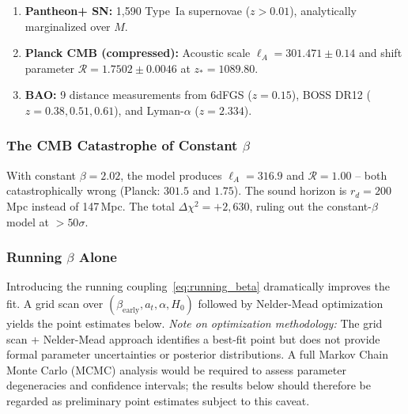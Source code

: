 \documentclass[aps,prd,twocolumn,superscriptaddress,nofootinbib]{revtex4-2}
\begin{document}
\begin{enumerate}
\item \textbf{Pantheon+ SN:} 1,590 Type~Ia supernovae ($z > 0.01$), analytically marginalized over $M$.
\item \textbf{Planck CMB (compressed):} Acoustic scale $\ell_A = 301.471 \pm 0.14$ and shift parameter $\mathcal{R} = 1.7502 \pm 0.0046$ at $z_* = 1089.80$.
\item \textbf{BAO:} 9 distance measurements from 6dFGS ($z = 0.15$), BOSS DR12 \cite{Alam2017} ($z = 0.38, 0.51, 0.61$), and Lyman-$\alpha$ ($z = 2.334$).
\end{enumerate}

\subsubsection{The CMB Catastrophe of Constant $\beta$}

With constant $\beta = 2.02$, the model produces $\ell_A = 316.9$ and $\mathcal{R} = 1.00$ -- both catastrophically wrong (Planck: $301.5$ and $1.75$). The sound horizon is $r_d = 200$\,Mpc instead of 147\,Mpc. The total $\Delta\chi^2 = +2{,}630$, ruling out the constant-$\beta$ model at $>50\sigma$.

\subsubsection{Running $\beta$ Alone}

Introducing the running coupling~\eqref{eq:running_beta} dramatically improves the fit. A grid scan over $(\beta_{\mathrm{early}}, a_t, \alpha, H_0)$ followed by Nelder-Mead optimization yields the point estimates below. \textit{Note on optimization methodology:} The grid scan + Nelder-Mead approach identifies a best-fit point but does not provide formal parameter uncertainties or posterior distributions. A full Markov Chain Monte Carlo (MCMC) analysis would be required to assess parameter degeneracies and confidence intervals; the results below should therefore be regarded as preliminary point estimates subject to this caveat.
\end{document}
